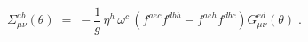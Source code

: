 \begin{equation}\label{eq:defsigma}
\Sigma_{\mu\nu}^{ab}(\theta) \;=\; - \frac{1}{g} \,
\eta^h \, \omega^c \, ( f^{aec}   f^{dbh} -   f^{aeh}   f^{dbc})
G_{\mu\nu}^{ed}(\theta) \;. 
\end{equation}

